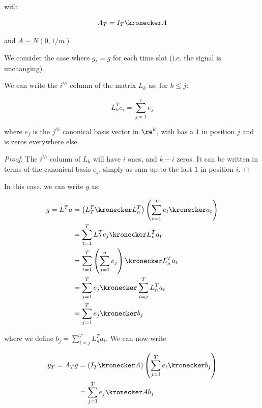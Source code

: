 with 

\begin{equation}
A_T = I_T \kronecker A
\end{equation}

and \(A \sim N(0, 1/m)\).

We consider the case where \(g_t = g\) for each time slot (i.e. the signal is unchanging). 

\begin{proposition}
We can write the \(i^{th}\) column of the matrix \(L_k\) as, for \(k \leq j\):

\begin{equation}
L_k^T e_i = \sum_{j=1}^i e_j
\end{equation}

where \(e_j\) is the \(j^{th}\) canonical basis vector in \(\re^k\), with has a \(1\) in position \(j\) and is zeros everywhere else.

\begin{proof}
The \(i^{th}\) column of \(L_k\) will have \(i\) ones, and \(k-i\) zeros. It can be written in terms of the canonical basis \(e_j\), simply as sum up to the last \(1\) in position \(i\).
\end{proof}

\end{proposition}

In this case, we can write \(g\) as:

\begin{align*}
g = L^T a &= \left(L_T^T \kronecker L_n^T\right)\left(\sum_{t=1}^T e_t \kronecker a_t\right) \\
&= \sum_{t=1}^T L_T^T e_j \kronecker L_n^Ta_t \\
&= \sum_{t=1}^T \left(\sum_{j=1}^n e_j \right) \kronecker L_n^T a_t \\
&= \sum_{j=1}^T e_j \kronecker \sum_{t=j}^T L_n^T a_t \\
&= \sum_{j=1}^T e_j \kronecker b_j
\end{align*}

where we define \(b_j = \sum_{t=j}^T L_n^T a_t\). We can now write

\begin{align*}
y_T = A_Tg &= \left(I_T \kronecker A \right) \left(\sum_{j=1}^T e_i \kronecker b_j\right)\\
&= \sum_{j=1}^T e_j \kronecker Ab_j
\end{align*}

